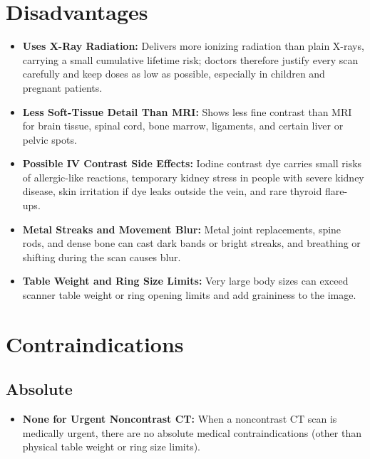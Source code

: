 \section{Disadvantages}
\begin{itemize}
    \item \textbf{Uses X-Ray Radiation:} Delivers more ionizing radiation than plain X-rays, carrying a small cumulative lifetime risk; doctors therefore justify every scan carefully and keep doses as low as possible, especially in children and pregnant patients.
    \item \textbf{Less Soft-Tissue Detail Than MRI:} Shows less fine contrast than MRI for brain tissue, spinal cord, bone marrow, ligaments, and certain liver or pelvic spots.
    \item \textbf{Possible IV Contrast Side Effects:} Iodine contrast dye carries small risks of allergic-like reactions, temporary kidney stress in people with severe kidney disease, skin irritation if dye leaks outside the vein, and rare thyroid flare-ups.
    \item \textbf{Metal Streaks and Movement Blur:} Metal joint replacements, spine rods, and dense bone can cast dark bands or bright streaks, and breathing or shifting during the scan causes blur.
    \item \textbf{Table Weight and Ring Size Limits:} Very large body sizes can exceed scanner table weight or ring opening limits and add graininess to the image.
\end{itemize}

\section{Contraindications}

\subsection{Absolute}
\begin{itemize}
    \item \textbf{None for Urgent Noncontrast CT:} When a noncontrast CT scan is medically urgent, there are no absolute medical contraindications (other than physical table weight or ring size limits).
\end{itemize}

